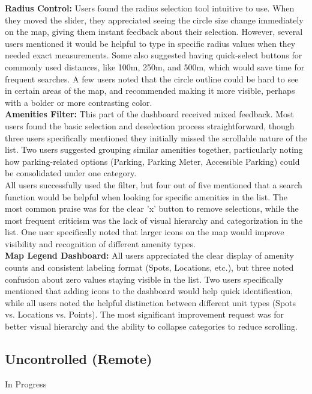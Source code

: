 \documentclass{report}
\begin{document}
\textbf{Radius Control: }
Users found the radius selection tool intuitive to use. When they moved the slider, they appreciated seeing the circle size change immediately on the map, giving them instant feedback about their selection. However, several users mentioned it would be helpful to type in specific radius values when they needed exact measurements. Some also suggested having quick-select buttons for commonly used distances, like 100m, 250m, and 500m, which would save time for frequent searches. A few users noted that the circle outline could be hard to see in certain areas of the map, and recommended making it more visible, perhaps with a bolder or more contrasting color.\\

\textbf{Amenities Filter: }
This part of the dashboard received mixed feedback. Most users found the basic selection and deselection process straightforward, though three users specifically mentioned they initially missed the scrollable nature of the list. Two users suggested grouping similar amenities together, particularly noting how parking-related options (Parking, Parking Meter, Accessible Parking) could be consolidated under one category.\\ All users successfully used the filter, but four out of five mentioned that a search function would be helpful when looking for specific amenities in the list. The most common praise was for the clear 'x' button to remove selections, while the most frequent criticism was the lack of visual hierarchy and categorization in the list. One user specifically noted that larger icons on the map would improve visibility and recognition of different amenity types.\\

\textbf{Map Legend Dashboard: }
All users appreciated the clear display of amenity counts and consistent labeling format (Spots, Locations, etc.), but three  noted confusion about zero values staying visible in the list. Two users specifically mentioned that adding icons to the dashboard would help quick identification, while all users noted the helpful distinction between different unit types (Spots vs. Locations vs. Points). The most significant improvement request was for better visual hierarchy and the ability to collapse categories to reduce scrolling. \\

\subsection{Uncontrolled (Remote)}
In Progress
\end{document}

